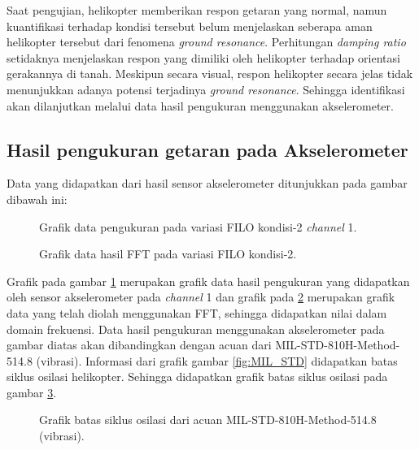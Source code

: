 Saat pengujian, helikopter memberikan respon getaran yang normal, namun kuantifikasi terhadap kondisi tersebut belum menjelaskan seberapa aman helikopter tersebut dari fenomena \textit{ground resonance}. Perhitungan \textit{damping ratio} setidaknya menjelaskan respon yang dimiliki oleh helikopter terhadap orientasi gerakannya di tanah. Meskipun secara visual, respon helikopter secara jelas tidak menunjukkan adanya potensi terjadinya \textit{ground resonance}. Sehingga identifikasi akan dilanjutkan melalui data hasil pengukuran menggunakan akselerometer.

\subsection{Hasil pengukuran getaran pada Akselerometer}

Data yang didapatkan dari hasil sensor akselerometer ditunjukkan pada gambar dibawah ini:

\begin{figure}[H]
	\centering
	\caption{Grafik data pengukuran pada variasi FILO kondisi-2 \textit{channel} 1.}
	\label{fig:raw_config2_FILO}
\end{figure}

\begin{figure}[H]
	\centering
	\caption{Grafik data hasil FFT pada variasi FILO kondisi-2.}
	\label{fig:fft_config2_FILO}
\end{figure}

Grafik pada gambar \ref{fig:raw_config2_FILO} merupakan grafik data hasil pengukuran yang didapatkan oleh sensor akselerometer pada \textit{channel} 1 dan grafik pada \ref{fig:fft_config2_FILO} merupakan grafik data yang telah diolah menggunakan FFT, sehingga didapatkan nilai dalam domain frekuensi. Data hasil pengukuran menggunakan akselerometer pada gambar diatas akan dibandingkan dengan acuan dari MIL-STD-810H-Method-514.8 (vibrasi). Informasi dari grafik gambar \ref{fig:MIL_STD} didapatkan batas siklus osilasi helikopter. Sehingga didapatkan grafik batas siklus osilasi pada gambar \ref{fig:batas_siklus}.

\begin{figure}[h]
	\centering
	\caption{Grafik batas siklus osilasi dari acuan MIL-STD-810H-Method-514.8 (vibrasi).}
	\label{fig:batas_siklus}
\end{figure}

